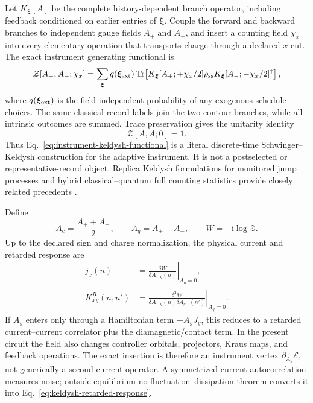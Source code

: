 \documentclass[aps,prb,onecolumn,nofootinbib,superscriptaddress]{revtex4-2}
\newcommand{\Tr}{\operatorname{Tr}}
\newcommand{\ii}{\mathrm{i}}
\newcommand{\cE}{\mathcal{E}}
\newcommand{\bxi}{\bm{\xi}}
\newcommand{\ssub}{\mathrm{ss}}
\begin{document}
Let $K_{\bxi}[A]$ be the complete history-dependent branch operator, including
feedback conditioned on earlier entries of $\bxi$.  Couple the forward and
backward branches to independent gauge fields $A_+$ and $A_-$, and insert a
counting field $\chi_x$ into every elementary operation that transports charge
through a declared $x$ cut.  The exact instrument generating functional is
\begin{equation}
  \mathcal Z[A_+,A_-;\chi_x]
  =\sum_{\bxi}q(\bxi_{\rm ext})
  \Tr\!\left[
    K_{\bxi}[A_+;+\chi_x/2]\rho_{\ssub}
    K_{\bxi}[A_-;-\chi_x/2]^\dagger
  \right],
  \label{eq:instrument-keldysh-functional}
\end{equation}
where $q(\bxi_{\rm ext})$ is the field-independent probability of any
exogenous schedule choices.  The same classical record labels join the two
contour branches, while all intrinsic outcomes are summed.  Trace preservation
gives the unitarity identity
\begin{equation}
  \mathcal Z[A,A;0]=1.
  \label{eq:keldysh-normalization}
\end{equation}
Thus Eq.~\eqref{eq:instrument-keldysh-functional} is a literal discrete-time
Schwinger--Keldysh construction for the adaptive instrument.  It is not a
postselected or representative-record object.  Replica Keldysh formulations
for monitored jump processes and hybrid classical--quantum full counting
statistics provide closely related precedents
\cite{KloiberTollingerSieberer2026,RosalFiusaPottsLandi2026}.

Define
\begin{equation}
  A_c=\frac{A_++A_-}{2},
  \qquad A_q=A_+-A_-,
  \qquad W=-\ii\log\mathcal Z.
\end{equation}
Up to the declared sign and charge normalization, the physical current and
retarded response are
\begin{align}
  \bar j_x(n)
  &=\left.\frac{\delta W}{\delta A_{x,q}(n)}\right|_{A_q=0},
  \label{eq:keldysh-current}\\
  K^R_{xy}(n,n')
  &=\left.
  \frac{\delta^2W}
  {\delta A_{x,q}(n)\delta A_{y,c}(n')}
  \right|_{A_q=0}.
  \label{eq:keldysh-retarded-response}
\end{align}
If $A_y$ enters only through a Hamiltonian term $-A_yJ_y$, this reduces to a
retarded current--current correlator plus the diamagnetic/contact term.  In the
present circuit the field also changes controller orbitals, projectors, Kraus
maps, and feedback operations.  The exact insertion is therefore an
instrument vertex $\partial_{A_y}\cE$, not generically a second current
operator.  A symmetrized current autocorrelation measures noise; outside
equilibrium no fluctuation--dissipation theorem converts it into
Eq.~\eqref{eq:keldysh-retarded-response}.
\end{document}
